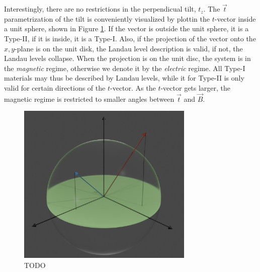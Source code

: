 Interestingly, there are no restrictions in the perpendicual tilt, \( t_z \).
The \( \vec{t} \) parametrization of the tilt is conveniently visualized by plottin the \( t \)-vector inside a unit sphere, shown in Figure \ref{fig:tiltSphere}.
If the vector is outside the unit sphere, it is a Type-II, if it is inside, it is a Type-I.
Also, if the projection of the vector onto the \(x,y\)-plane is on the unit disk, the Landau level description is valid, if not, the Landau levels collapse.
When the projection is on the unit disc, the system is in the \emph{magnetic} regime, otherwise we denote it by the \emph{electric} regime.
All Type-I materials may thus be described by Landau levels, while it for Type-II is only valid for certain directions of the \(t\)-vector.
As the \(t\)-vector gets larger, the magnetic regime is restricted to smaller angles between \( \vec{t} \) and \( \vec{B} \).
\begin{figure}[ht]
  \centering
  \includegraphics[width=0.75\textwidth]{figures/tiltSpherewBackground.png}
  \caption{\label{fig:tiltSphere} TODO}
\end{figure}

